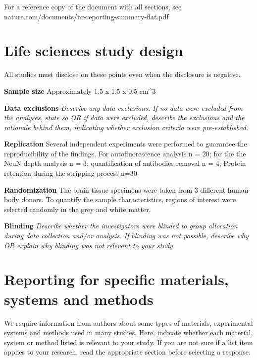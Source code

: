 \documentclass{article}
\begin{document}
\noindent For a reference copy of the document with all sections, see nature.com/documents/nr-reporting-summary-flat.pdf

\section*{Life sciences study design}

\noindent All studies must disclose on these points even when the disclosure is negative.

\noindent \textbf{Sample size} Approximately 1.5 x 1.5 x 0.5 cm\textasciicircum{}3

\noindent \textbf{Data exclusions} \emph{Describe any data exclusions. If no data were excluded from the analyses, state so OR if data were excluded, describe the exclusions and the rationale behind them, indicating whether exclusion criteria were pre-established.}

\noindent \textbf{Replication} Several independent experiments were performed to guarantee the reproducibility of the findings. For autofluorescence analysis n = 20; for the the NeuN depth analysis n = 3; quantification of antibodies removal n = 4; Protein retention during the stripping process n=30

\noindent \textbf{Randomization} The brain tissue specimens were taken from 3 different human body donors. To quantify the sample characteristics, regions of interest were selected randomly in the grey and white matter.

\noindent \textbf{Blinding} \emph{Describe whether the investigators were blinded to group allocation during data collection and/or analysis. If blinding was not possible, describe why OR explain why blinding was not relevant to your study.}

\section*{Reporting for specific materials, systems and methods}

\noindent We require information from authors about some types of materials, experimental systems and methods used in many studies. Here, indicate whether each material, system or method listed is relevant to your study. If you are not sure if a list item applies to your research, read the appropriate section before selecting a response.
\end{document}
